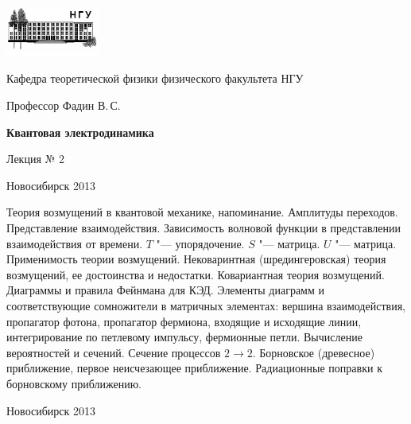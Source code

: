 \documentclass[12pt,pagesize,paper=192mm:108mm]{scrbook}
\begin{document}
\begin{titlepage}
  \vspace*{-1em}
  \begin{center}
    \includegraphics[width=0.23\textwidth]{../NSU-logo}

    Кафедра теоретической физики физического факультета НГУ
    \medskip

    \Large
    Профессор Фадин В.\,С.
    \bigskip

    \huge
    \textbf{Квантовая электродинамика}
    \bigskip

    \Large
    Лекция № 2
    \vfill

    \normalsize
    \vfill

    \normalsize \ccbysa\hspace{0.5em}  Новосибирск 2013
  \end{center}
\end{titlepage}
\newpage

\vspace*{-1em}
\begin{center}
\vfill
  \begin{minipage}{0.65\linewidth}
    Теория возмущений в квантовой механике, напоминание. Амплитуды
    переходов.  Представление взаимодействия. Зависимость волновой
    функции в представлении взаимодействия от времени. $T$ "---
    упорядочение. $S$ "--- матрица. $U$ "--- матрица.  Применимость теории
    возмущений. Нековаринтная (шредингеровская) теория возмущений, ее
    достоинства и недостатки. Ковариантная теория
    возмущений. Диаграммы и правила Фейнмана для КЭД. Элементы
    диаграмм и соответствующие сомножители в матричных элементах:
    вершина взаимодействия, пропагатор фотона, пропагатор фермиона,
    входящие и исходящие линии, интегрирование по петлевому импульсу,
    фермионные петли. Вычисление вероятностей и сечений. Сечение
    процессов $2 \to 2$. Борновское (древесное) приближение, первое
    неисчезающее приближение. Радиационные поправки к борновскому
    приближению.
  \end{minipage}
  \vfill

  \normalsize \ccbysa\hspace{0.5em} Новосибирск 2013
\end{center}
\end{document}
